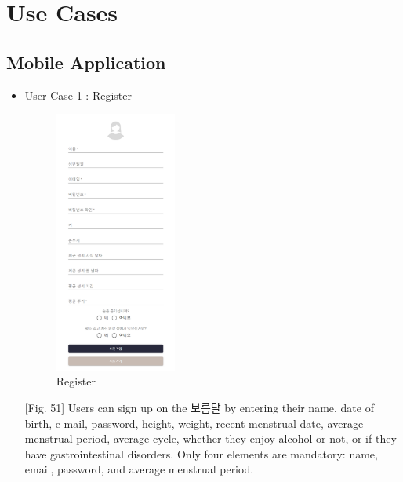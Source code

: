 \documentclass[conference]{IEEEtran}
\begin{document}
\section{Use Cases}
\subsection{Mobile Application}
\begin{itemize}
    \item User Case 1 : Register
    \begin{figure}[ht]
    \includegraphics[width=4cm, center]{speregi.png}
    \caption{Register}
    \label{fig51}
    \end{figure}
    [Fig. 51] Users can sign up on the 보름달 by entering their name, date of birth, e-mail, password, height, weight, recent menstrual date, average menstrual period, average cycle, whether they enjoy alcohol or not, or if they have gastrointestinal disorders. Only four elements are mandatory: name, email, password, and average menstrual period.
    

\end{itemize}
\end{document}
